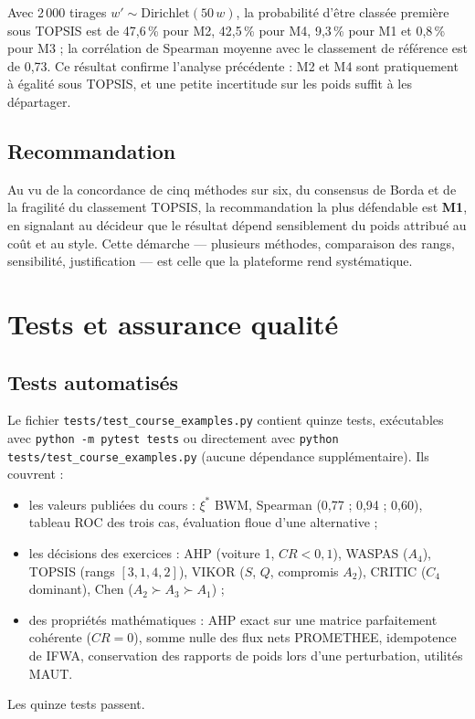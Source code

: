 \documentclass[11pt,a4paper]{report}
\theoremstyle{definition}
\theoremstyle{remark}
\begin{document}
Avec 2\,000 tirages $w'\sim\text{Dirichlet}(50\,w)$, la probabilité d'être classée première sous TOPSIS est
de 47,6\,\% pour M2, 42,5\,\% pour M4, 9,3\,\% pour M1 et 0,8\,\% pour M3 ; la corrélation de Spearman
moyenne avec le classement de référence est de 0,73. Ce résultat confirme l'analyse précédente : M2 et M4
sont pratiquement à égalité sous TOPSIS, et une petite incertitude sur les poids suffit à les départager.

\section{Recommandation}

Au vu de la concordance de cinq méthodes sur six, du consensus de Borda et de la fragilité du classement
TOPSIS, la recommandation la plus défendable est \textbf{M1}, en signalant au décideur que le résultat
dépend sensiblement du poids attribué au coût et au style. Cette démarche --- plusieurs méthodes,
comparaison des rangs, sensibilité, justification --- est celle que la plateforme rend systématique.

\chapter{Tests et assurance qualité}\label{ch:tests}

\section{Tests automatisés}

Le fichier \texttt{tests/test\_course\_examples.py} contient quinze tests, exécutables avec
\texttt{python -m pytest tests} ou directement avec \texttt{python tests/test\_course\_examples.py}
(aucune dépendance supplémentaire). Ils couvrent :
\begin{itemize}
  \item les valeurs publiées du cours : $\xi^*$ BWM, Spearman (0,77 ; 0,94 ; 0,60), tableau ROC des trois
        cas, évaluation floue d'une alternative ;
  \item les décisions des exercices : AHP (voiture 1, $CR<0{,}1$), WASPAS ($A_4$), TOPSIS (rangs
        $[3,1,4,2]$), VIKOR ($S$, $Q$, compromis $A_2$), CRITIC ($C_4$ dominant), Chen
        ($A_2\succ A_3\succ A_1$) ;
  \item des propriétés mathématiques : AHP exact sur une matrice parfaitement cohérente ($CR=0$), somme
        nulle des flux nets PROMETHEE, idempotence de IFWA, conservation des rapports de poids lors d'une
        perturbation, utilités MAUT.
\end{itemize}
Les quinze tests passent.
\end{document}

